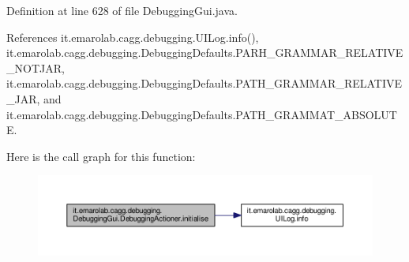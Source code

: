 Definition at line 628 of file Debugging\-Gui.\-java.



References it.\-emarolab.\-cagg.\-debugging.\-U\-I\-Log.\-info(), it.\-emarolab.\-cagg.\-debugging.\-Debugging\-Defaults.\-P\-A\-R\-H\-\_\-\-G\-R\-A\-M\-M\-A\-R\-\_\-\-R\-E\-L\-A\-T\-I\-V\-E\-\_\-\-N\-O\-T\-J\-A\-R, it.\-emarolab.\-cagg.\-debugging.\-Debugging\-Defaults.\-P\-A\-T\-H\-\_\-\-G\-R\-A\-M\-M\-A\-R\-\_\-\-R\-E\-L\-A\-T\-I\-V\-E\-\_\-\-J\-A\-R, and it.\-emarolab.\-cagg.\-debugging.\-Debugging\-Defaults.\-P\-A\-T\-H\-\_\-\-G\-R\-A\-M\-M\-A\-T\-\_\-\-A\-B\-S\-O\-L\-U\-T\-E.



Here is the call graph for this function\-:
\nopagebreak
\begin{figure}[H]
\begin{center}
\leavevmode
\includegraphics[width=350pt]{classit_1_1emarolab_1_1cagg_1_1debugging_1_1DebuggingGui_1_1DebuggingActioner_a2b41bb8fbb9f4705bc248f52cf77e8b6_cgraph}
\end{center}
\end{figure}


